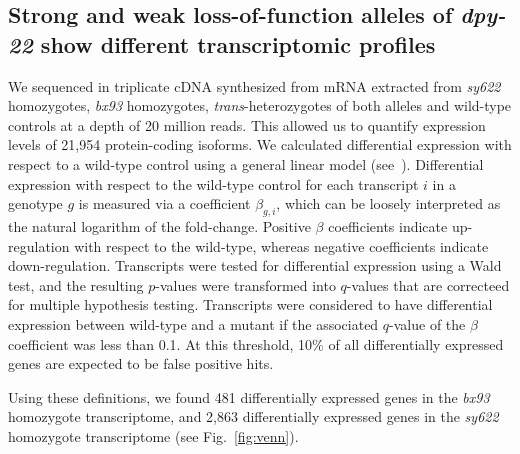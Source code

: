 \documentclass[10pt, twocolumn]{article}
\newcommand{\gene}[1]{\mbox{\emph{#1}}}
\newcommand{\dpy}{\gene{mdt-12}}
\newcommand{\strongn}{2,863}
\newcommand{\weakn}{481}
\begin{document}
\subsection*{Strong and weak loss-of-function alleles of \gene{dpy-22} show
             different transcriptomic profiles}

We sequenced in triplicate cDNA synthesized from mRNA extracted from
\emph{sy622} homozygotes, \emph{bx93} homozygotes,
\emph{trans}-heterozygotes of both alleles and wild-type controls at a depth of
20 million reads. This allowed us to quantify expression levels of
21,954 protein-coding isoforms. We calculated differential expression with
respect to a wild-type control using a general linear model
(see~). Differential expression with respect to the
wild-type control for each transcript $i$ in a genotype $g$ is measured via a
coefficient $\beta_{g, i}$, which can be loosely interpreted as the natural
logarithm of the fold-change. Positive $\beta$ coefficients indicate
up-regulation with respect to the wild-type, whereas negative coefficients
indicate down-regulation. Transcripts were tested for differential expression
using a Wald test, and the resulting $p$-values were transformed into $q$-values
that are correcteed for multiple hypothesis testing. Transcripts were considered
to have differential expression between wild-type and a mutant if the associated
$q$-value of the $\beta$ coefficient was less than 0.1. At this threshold, 10\%
of all differentially expressed genes are expected to be false positive hits.

Using these definitions, we found \weakn{} differentially expressed
genes in the  \emph{bx93} homozygote transcriptome, and \strongn{}
differentially expressed genes in the \emph{sy622} homozygote transcriptome
(see Fig.~\ref{fig:venn}).
\end{document}
